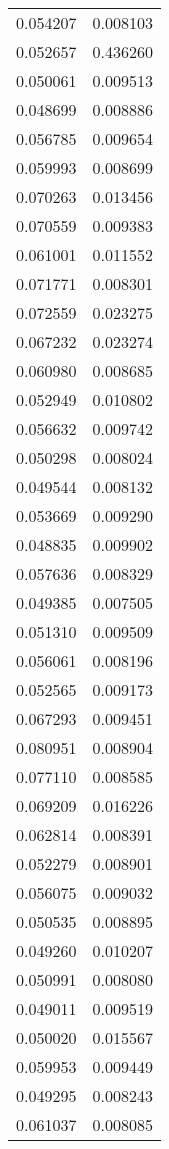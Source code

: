 \begin{longtable}[c]{ll}
    0.054207 & 0.008103 \\
    0.052657 & 0.436260 \\
    0.050061 & 0.009513 \\
    0.048699 & 0.008886 \\
    0.056785 & 0.009654 \\
    0.059993 & 0.008699 \\
    0.070263 & 0.013456 \\
    0.070559 & 0.009383 \\
    0.061001 & 0.011552 \\
    0.071771 & 0.008301 \\
    0.072559 & 0.023275 \\
    0.067232 & 0.023274 \\
    0.060980 & 0.008685 \\
    0.052949 & 0.010802 \\
    0.056632 & 0.009742 \\
    0.050298 & 0.008024 \\
    0.049544 & 0.008132 \\
    0.053669 & 0.009290 \\
    0.048835 & 0.009902 \\
    0.057636 & 0.008329 \\
    0.049385 & 0.007505 \\
    0.051310 & 0.009509 \\
    0.056061 & 0.008196 \\
    0.052565 & 0.009173 \\
    0.067293 & 0.009451 \\
    0.080951 & 0.008904 \\
    0.077110 & 0.008585 \\
    0.069209 & 0.016226 \\
    0.062814 & 0.008391 \\
    0.052279 & 0.008901 \\
    0.056075 & 0.009032 \\
    0.050535 & 0.008895 \\
    0.049260 & 0.010207 \\
    0.050991 & 0.008080 \\
    0.049011 & 0.009519 \\
    0.050020 & 0.015567 \\
    0.059953 & 0.009449 \\
    0.049295 & 0.008243 \\
    0.061037 & 0.008085 \\

\end{longtable}
